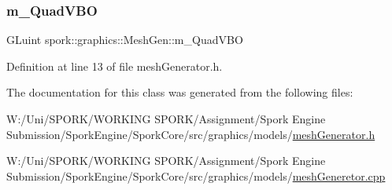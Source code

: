 \subsubsection{\texorpdfstring{m\+\_\+\+Quad\+V\+BO}{m\_QuadVBO}}
{\footnotesize\ttfamily G\+Luint spork\+::graphics\+::\+Mesh\+Gen\+::m\+\_\+\+Quad\+V\+BO\hspace{0.3cm}{\ttfamily [private]}}



Definition at line 13 of file mesh\+Generator.\+h.



The documentation for this class was generated from the following files\+:\begin{DoxyCompactItemize}
\item 
W\+:/\+Uni/\+S\+P\+O\+R\+K/\+W\+O\+R\+K\+I\+N\+G S\+P\+O\+R\+K/\+Assignment/\+Spork Engine Submission/\+Spork\+Engine/\+Spork\+Core/src/graphics/models/\hyperlink{mesh_generator_8h}{mesh\+Generator.\+h}\item 
W\+:/\+Uni/\+S\+P\+O\+R\+K/\+W\+O\+R\+K\+I\+N\+G S\+P\+O\+R\+K/\+Assignment/\+Spork Engine Submission/\+Spork\+Engine/\+Spork\+Core/src/graphics/models/\hyperlink{mesh_generetor_8cpp}{mesh\+Generetor.\+cpp}\end{DoxyCompactItemize}
